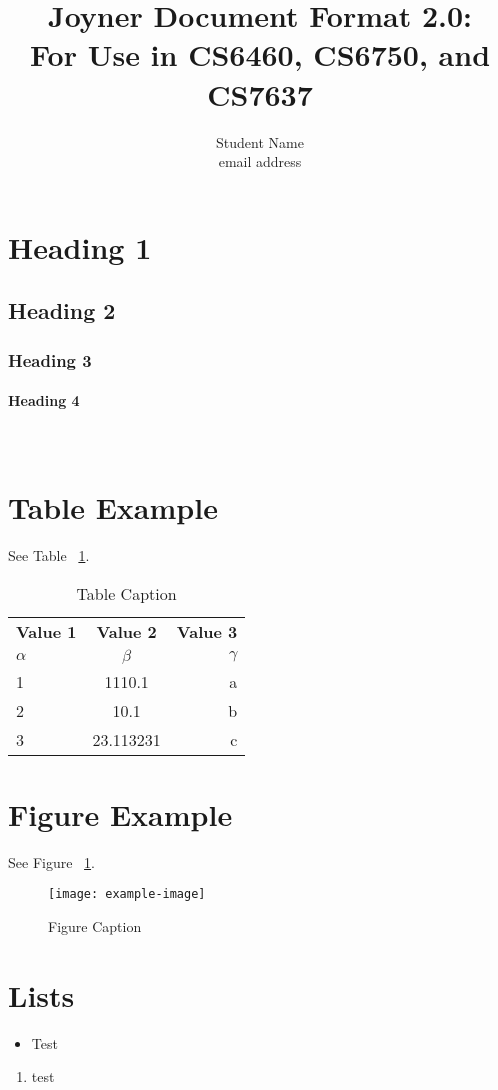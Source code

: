 \documentclass{jdf}
\title{Joyner Document Format 2.0:\\ For Use in CS6460, CS6750, and CS7637}
\author{Student Name \\ email address}
\begin{document}
\maketitle

\thispagestyle{fancy}

\begin{abstract}
\lipsum[1]

\end{abstract}

\section{Heading 1}
\lipsum[2]

\subsection{Heading 2}
\lipsum[3]

\subsubsection{Heading 3}
\lipsum[4]

\paragraph*{Heading 4}\textemdash\
\lipsum[5]

\section*{Table Example}
See Table ~\ref{table:1}.
\begin{table}[H]
  \begin{center}
    \caption{Table Caption}
    \label{table:1}
    \begin{tabular}{l|c|r}
      \textbf{Value 1} & \textbf{Value 2} & \textbf{Value 3}\\
      $\alpha$ & $\beta$ & $\gamma$ \\
      \hline
      1 & 1110.1 & a\\
      2 & 10.1 & b\\
      3 & 23.113231 & c\\
    \end{tabular}
  \end{center}
\end{table}

\section*{Figure Example}
See Figure ~\ref{fig::1}.
\begin{figure}[H]
\centering
\texttt{[image: example-image]}
\caption{Figure Caption}
\label{fig::1}
\end{figure}

\section*{Lists}
\begin{itemize}[leftmargin=.5in]
\item Test
\end{itemize}

\begin{enumerate}[leftmargin=.5in]
\item test \cite{test}
\end{enumerate}



\end{document}
